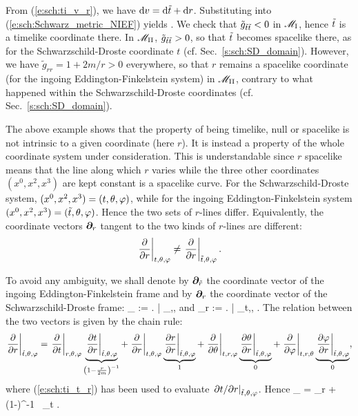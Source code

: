 From (\ref{e:sch:ti_v_r}), we have $\mathrm{d} v = \mathrm{d}{\tilde t} + \mathrm{d} r$. Substituting
into (\ref{e:sch:Schwarz_metric_NIEF}) yields
\be \label{e:sch:Schwarz_metric_EF}
    .
\ee
We check that $\tilde{g}_{{\tilde t}{\tilde t}} < 0$ in $\mathscr{M}_{\rm I}$, hence ${\tilde t}$ is
a timelike coordinate there.
In $\mathscr{M}_{\rm II}$, $\tilde{g}_{{\tilde t}{\tilde t}} > 0$, so that ${\tilde t}$ becomes spacelike
there, as for the Schwarzschild-Droste coordinate $t$ (cf. Sec.~\ref{s:sch:SD_domain}).
However, we have $\tilde{g}_{rr} = 1+2m/r > 0$ everywhere, so that $r$ remains a spacelike coordinate (for the ingoing Eddington-Finkelstein system) in
$\mathscr{M}_{\rm II}$, contrary to what happened within the Schwarzschild-Droste coordinates
(cf. Sec.~\ref{s:sch:SD_domain}).

\begin{remark}
The above example shows that the property of being timelike, null or spacelike
is not intrinsic to a given coordinate (here $r$). It is instead a property
of the whole coordinate system under consideration. This is understandable
since $r$ spacelike means that the line along which $r$ varies while the
three other coordinates $(x^0,x^2,x^3)$ are kept constant is a spacelike curve.
For the Schwarzschild-Droste system, $(x^0,x^2,x^3) = (t,\theta,\varphi)$,
while for the ingoing Eddington-Finkelstein system $(x^0,x^2,x^3) = ({\tilde t},\theta,\varphi)$.
Hence the two sets of $r$-lines differ.
Equivalently, the coordinate vectors $\bm{\partial}_r$
tangent to the two kinds of $r$-lines are different:
\[
    \left. \frac{\partial }{\partial r} \right| _{t,\theta,\varphi} \not= \left. \frac{\partial }{\partial r} \right| _{{\tilde t},\theta,\varphi} .
\]
\end{remark}
To avoid any ambiguity, we shall denote by $\bm{\partial}_{\tilde{r}}$ the
coordinate vector of the ingoing Eddington-Finkelstein frame and by
$\bm{\partial}_r$ the coordinate vector of the Schwarzschild-Droste frame:
\be
    \wpar_{} := \left.  \right| _{\ti,\th,\ph}
    \qquad\mbox{and}\qquad
    \wpar_r := \left.  \right| _{t,\th,\ph} .
\ee
The relation between the two vectors is given by the chain rule:
\[
    \left. \frac{\partial }{\partial r} \right| _{{\tilde t},\theta,\varphi}  =
    \left. \frac{\partial }{\partial t} \right| _{r,\theta,\varphi}
    \underbrace{ \left. \frac{\partial t}{\partial r} \right| _{{\tilde t},\theta,\varphi}}_{\left(1-\frac{r}{2m}\right)^{-1}}
  + \left. \frac{\partial }{\partial r} \right| _{t,\theta,\varphi}
   \underbrace{\left. \frac{\partial r}{\partial r} \right| _{{\tilde t},\theta,\varphi}}_{1}
  + \left. \frac{\partial }{\partial \theta} \right| _{t,r,\varphi}
  \underbrace{\left. \frac{\partial \theta}{\partial r} \right| _{{\tilde t},\theta,\varphi}}_{0}
  + \left. \frac{\partial }{\partial \varphi} \right| _{t,r,\theta}
  \underbrace{\left. \frac{\partial \varphi}{\partial r} \right| _{{\tilde t},\theta,\varphi}}_{0} ,
\]
where (\ref{e:sch:ti_t_r}) has been used to evaluate
$\left. {\partial t}/{\partial r} \right| _{{\tilde t},\theta,\varphi}$. Hence
\be
    \wpar_{} = \wpar_r + \left(1-\right)^{-1} \, \wpar_t .
\ee

